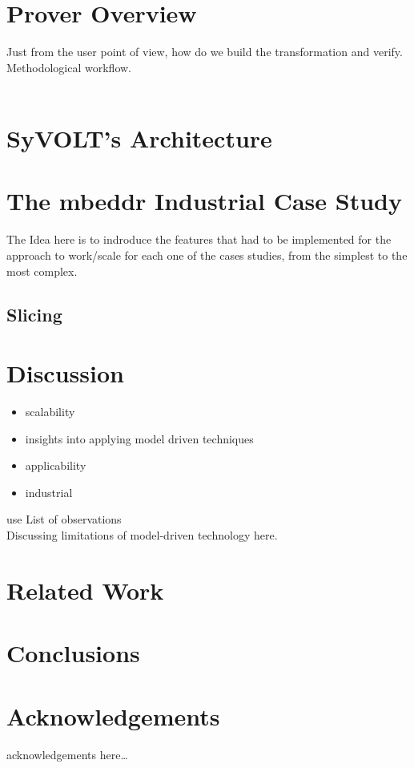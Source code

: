 \documentclass[conference]{IEEEtran}
\begin{document}
\section{Prover Overview}
Just from the user point of view, how do we build the transformation and
verify. Methodological workflow.\\\\


\section{SyVOLT's Architecture}
 

\section{The mbeddr Industrial Case Study}
The Idea here is to indroduce the features that had to be implemented for the
approach to work/scale for each one of the cases studies, from the simplest to
the most complex.
\subsection{Slicing}

\section{Discussion}
\begin{itemize}
\item scalability
\item insights into applying model driven techniques
\item applicability
\item industrial
\end{itemize}
use List of observations\\
Discussing limitations of model-driven technology here.
 

\section{Related Work}


\section{Conclusions}


\section*{Acknowledgements}
acknowledgements here\ldots



\end{document}
